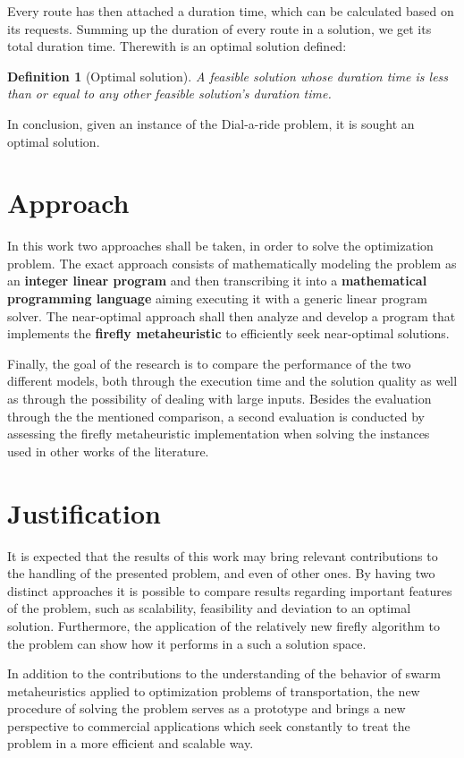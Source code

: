 \documentclass[tuberlin,cic,tc,openright,english,noabntcite,oneside]{iiufrgs}
\newtheorem{definition}{Definition}
\begin{document}
Every route has then attached a duration time, which can be calculated based on its requests. Summing up the duration of every route in a solution, we get its total duration time. Therewith is an optimal solution defined:
\begin{definition}[Optimal solution]
A feasible solution whose duration time is less than or equal to any other feasible solution's duration time.
\end{definition}

In conclusion, given an instance of the Dial-a-ride problem, it is sought an optimal solution.

\section{Approach}
In this work two approaches shall be taken, in order to solve the optimization problem. The exact approach consists of mathematically modeling the problem as an \textbf{integer linear program} and then transcribing it into a \textbf{mathematical programming language} aiming executing it with a generic linear program solver. The near-optimal approach shall then analyze and develop a program that implements the \textbf{firefly metaheuristic} to efficiently seek near-optimal solutions.

Finally, the goal of the research is to compare the performance of the two different models, both through the execution time and the solution quality as well as through the possibility of dealing with large inputs. Besides the evaluation through the the mentioned comparison, a second evaluation is conducted by assessing the firefly metaheuristic implementation when solving the instances used in other works of the literature.

\section{Justification}
It is expected that the results of this work may bring relevant contributions to the handling of the presented problem, and even of other ones. By having two distinct approaches it is possible to compare results regarding important features of the problem, such as scalability, feasibility and deviation to an optimal solution. Furthermore, the application of the relatively new firefly algorithm to the problem can show how it performs in a such a solution space.

In addition to the contributions to the understanding of the behavior of swarm metaheuristics applied to optimization problems of transportation, the new procedure of solving the problem serves as a prototype and brings a new perspective to commercial applications which seek constantly to treat the problem in a more efficient and scalable way.
\end{document}
